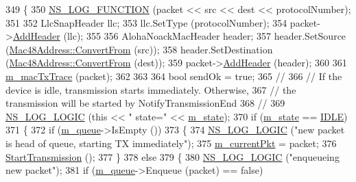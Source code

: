 \begin{DoxyCode}
349 \{
350   \hyperlink{log-macros-disabled_8h_a90b90d5bad1f39cb1b64923ea94c0761}{NS\_LOG\_FUNCTION} (packet << src << dest << protocolNumber);
351 
352   LlcSnapHeader llc;
353   llc.SetType (protocolNumber);
354   packet->\hyperlink{classns3_1_1Packet_a465108c595a0bc592095cbcab1832ed8}{AddHeader} (llc);
355 
356   AlohaNoackMacHeader header;
357   header.SetSource (\hyperlink{classns3_1_1Mac48Address_a911ce13603a9ef837545a032b6523ae4}{Mac48Address::ConvertFrom} (src));
358   header.SetDestination (\hyperlink{classns3_1_1Mac48Address_a911ce13603a9ef837545a032b6523ae4}{Mac48Address::ConvertFrom} (dest));
359   packet->\hyperlink{classns3_1_1Packet_a465108c595a0bc592095cbcab1832ed8}{AddHeader} (header);
360 
361   \hyperlink{classns3_1_1AlohaNoackNetDevice_ac8a6a956dfec61c30027e584963fa22a}{m\_macTxTrace} (packet);
362 
363 
364   \textcolor{keywordtype}{bool} sendOk = \textcolor{keyword}{true};
365   \textcolor{comment}{//}
366   \textcolor{comment}{// If the device is idle, transmission starts immediately. Otherwise,}
367   \textcolor{comment}{// the transmission will be started by NotifyTransmissionEnd}
368   \textcolor{comment}{//}
369   \hyperlink{group__logging_ga88acd260151caf2db9c0fc84997f45ce}{NS\_LOG\_LOGIC} (\textcolor{keyword}{this} << \textcolor{stringliteral}{" state="} << \hyperlink{classns3_1_1AlohaNoackNetDevice_a97acfcda000e8ec80108cac43682cea0}{m\_state});
370   \textcolor{keywordflow}{if} (\hyperlink{classns3_1_1AlohaNoackNetDevice_a97acfcda000e8ec80108cac43682cea0}{m\_state} == \hyperlink{classns3_1_1AlohaNoackNetDevice_adfe39ae2ca03685fc3dd2a78f9659b60a551a05fb0276de2fa4e689cecb3849e9}{IDLE})
371     \{
372       \textcolor{keywordflow}{if} (\hyperlink{classns3_1_1AlohaNoackNetDevice_a0c402bb86cd8d2475751d8198ddb3b10}{m\_queue}->IsEmpty ())
373         \{
374           \hyperlink{group__logging_ga88acd260151caf2db9c0fc84997f45ce}{NS\_LOG\_LOGIC} (\textcolor{stringliteral}{"new packet is head of queue, starting TX immediately"});
375           \hyperlink{classns3_1_1AlohaNoackNetDevice_a52e093adfac997a02fea5ad86735c142}{m\_currentPkt} = packet;
376           \hyperlink{classns3_1_1AlohaNoackNetDevice_a289a06303c625231c21b1d794fc3264b}{StartTransmission} ();
377         \}
378       \textcolor{keywordflow}{else}
379         \{
380           \hyperlink{group__logging_ga88acd260151caf2db9c0fc84997f45ce}{NS\_LOG\_LOGIC} (\textcolor{stringliteral}{"enqueueing new packet"});
381           \textcolor{keywordflow}{if} (\hyperlink{classns3_1_1AlohaNoackNetDevice_a0c402bb86cd8d2475751d8198ddb3b10}{m\_queue}->Enqueue (packet) == \textcolor{keyword}{false})

\end{DoxyCode}
